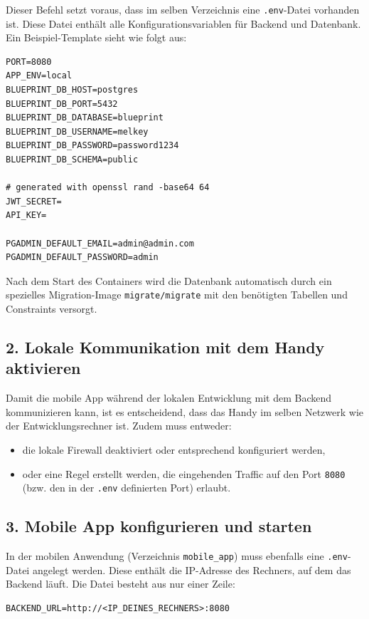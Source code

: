 \documentclass[11pt,a4paper]{article}
\begin{document}
Dieser Befehl setzt voraus, dass im selben Verzeichnis eine \texttt{.env}-Datei vorhanden ist. Diese Datei enthält alle Konfigurationsvariablen für Backend und Datenbank. Ein Beispiel-Template sieht wie folgt aus:

\begin{verbatim}
PORT=8080
APP_ENV=local
BLUEPRINT_DB_HOST=postgres
BLUEPRINT_DB_PORT=5432
BLUEPRINT_DB_DATABASE=blueprint
BLUEPRINT_DB_USERNAME=melkey
BLUEPRINT_DB_PASSWORD=password1234
BLUEPRINT_DB_SCHEMA=public

# generated with openssl rand -base64 64
JWT_SECRET=
API_KEY=

PGADMIN_DEFAULT_EMAIL=admin@admin.com
PGADMIN_DEFAULT_PASSWORD=admin
\end{verbatim}

Nach dem Start des Containers wird die Datenbank automatisch durch ein spezielles Migration-Image \texttt{migrate/migrate} mit den benötigten Tabellen und Constraints versorgt.

\subsection*{2. Lokale Kommunikation mit dem Handy aktivieren}

Damit die mobile App während der lokalen Entwicklung mit dem Backend kommunizieren kann, ist es entscheidend, dass das Handy im selben Netzwerk wie der Entwicklungsrechner ist. Zudem muss entweder:

\begin{itemize}
    \item die lokale Firewall deaktiviert oder entsprechend konfiguriert werden,
    \item oder eine Regel erstellt werden, die eingehenden Traffic auf den Port \texttt{8080} (bzw. den in der \texttt{.env} definierten Port) erlaubt.
\end{itemize}

\subsection*{3. Mobile App konfigurieren und starten}

In der mobilen Anwendung (Verzeichnis \texttt{mobile\_app}) muss ebenfalls eine \texttt{.env}-Datei angelegt werden. Diese enthält die IP-Adresse des Rechners, auf dem das Backend läuft. Die Datei besteht aus nur einer Zeile:

\begin{verbatim}
BACKEND_URL=http://<IP_DEINES_RECHNERS>:8080
\end{verbatim}
\end{document}
